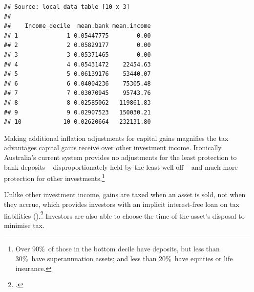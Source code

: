 \documentclass{grattan}\usepackage[]{graphicx}\usepackage[]{color}
\makeatletter
\newenvironment{kframe}{%
 \def\at@end@of@kframe{}%
 \ifinner\ifhmode%
  \def\at@end@of@kframe{\end{minipage}}%
  \begin{minipage}{\columnwidth}%
 \fi\fi%
 \def\FrameCommand##1{\hskip\@totalleftmargin \hskip-\fboxsep
 \colorbox{shadecolor}{##1}\hskip-\fboxsep
     \hskip-\linewidth \hskip-\@totalleftmargin \hskip\columnwidth}%
 \MakeFramed {\advance\hsize-\width
   \@totalleftmargin\z@ \linewidth\hsize
   \@setminipage}}%
 {\par\unskip\endMakeFramed%
 \at@end@of@kframe}
\newenvironment{knitrout}{}{} %
\makeatother
\begin{document}
\begin{knitrout}
\color{fgcolor}\begin{kframe}
\begin{verbatim}
## Source: local data table [10 x 3]
## 
##    Income_decile  mean.bank mean.income
## 1              1 0.05447775        0.00
## 2              2 0.05829177        0.00
## 3              3 0.05371465        0.00
## 4              4 0.05431472    22454.63
## 5              5 0.06139176    53440.07
## 6              6 0.04004236    75305.48
## 7              7 0.03070945    95743.76
## 8              8 0.02585062   119861.83
## 9              9 0.02907523   150030.21
## 10            10 0.02620664   232131.80
\end{verbatim}
\end{kframe}
\end{knitrout}

Making additional inflation adjustments for capital gains magnifies the tax advantages capital gains receive over other investment income. Ironically Australia's current system provides no adjustments for the least protection to bank deposits -- disproportionately held by the least well off -- and much more protection for other investments.\footnote{Over 90\%\ of those in the bottom decile have deposits, but less than 30\%\ have superannuation assets; and less than 20\%\ have equities or life insurance.}

Unlike other investment income, gains are taxed when an asset is sold, not when they accrue, which provides investors with an implicit interest-free loan on tax liabilities ().\footcites[See also:][p.~2]{Fane2004}[p.~12]{Ingles2009} Investors are also able to choose the time of the asset's disposal to minimise tax. 
\end{document}
